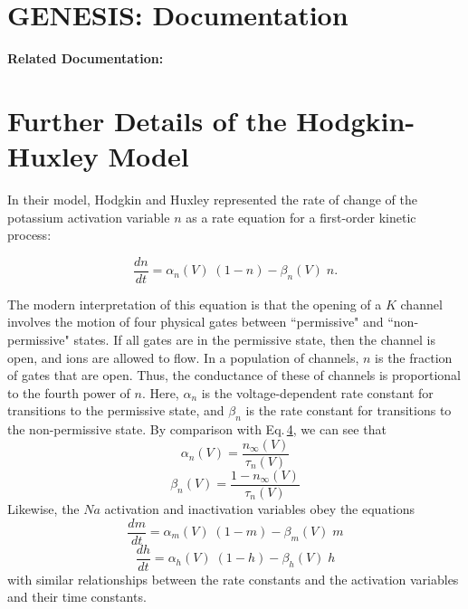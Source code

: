 \documentclass[12pt]{article}
\begin{document}
\section*{\setcounter{equation}{5}}

\section*{GENESIS: Documentation}

{\bf Related Documentation:}

\section*{Further Details of the Hodgkin-Huxley Model}

In their model, Hodgkin and Huxley represented the rate of change of the potassium activation variable $n$ as a rate equation for a first-order kinetic process:

\begin{equation}
		\frac{d n}{d t} = \alpha_n(V) \; (1-n) - \beta_n(V) \; n.
\label{eq:eq6}		
\end{equation}

The modern interpretation of this equation is that the opening of a $K$ channel involves the motion of four physical gates between ``permissive" and ``non-permissive" states. If all gates are in the permissive state, then the channel is open, and ions are allowed to flow. In a population of channels, $n$ is the fraction of gates that are open. Thus, the conductance of these of channels is proportional to the fourth power of $n$. Here, $\alpha_n$ is the voltage-dependent rate constant for transitions to the permissive state, and $\beta_n$ is the rate constant for transitions to the non-permissive state. By comparison with Eq.\,\href{../compneurosci-1/compneurosci-1.tex}{4}, we can see that
\begin{equation}
	\alpha_n(V) = \frac{n_{\infty}(V)}{\tau_n(V)}
\label{eq:eq7}		
\end{equation}
\begin{equation}
	\beta_n(V) = \frac{1 - n_{\infty}(V)}{\tau_n(V)}
\label{eq:eq8}		
\end{equation}
Likewise, the $Na$ activation and inactivation variables obey the equations
\begin{equation}
	\frac{d m}{d t} = \alpha_m(V) \; (1-m) - \beta_m(V) \; m
\label{eq:eq9}		
\end{equation}
\begin{equation}
	\frac{d h}{d t} = \alpha_h(V) \; (1-h) - \beta_h(V) \; h
\label{eq:eq10}	
\end{equation}
with similar relationships between the rate constants and the activation variables and their time constants.
\end{document}
